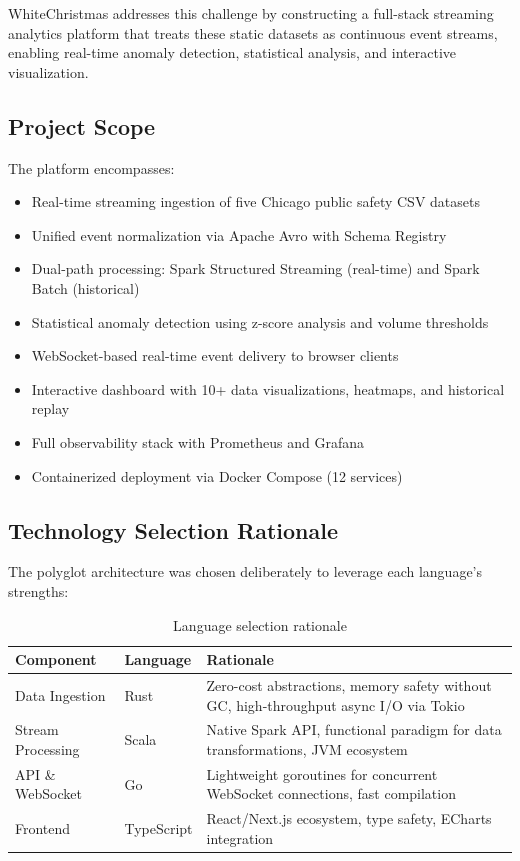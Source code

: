 \documentclass[12pt,a4paper]{article}
\begin{document}
WhiteChristmas addresses this challenge by constructing a full-stack streaming analytics platform that treats these static datasets as continuous event streams, enabling real-time anomaly detection, statistical analysis, and interactive visualization.

\subsection{Project Scope}

The platform encompasses:
\begin{itemize}
  \item Real-time streaming ingestion of five Chicago public safety CSV datasets
  \item Unified event normalization via Apache Avro with Schema Registry
  \item Dual-path processing: Spark Structured Streaming (real-time) and Spark Batch (historical)
  \item Statistical anomaly detection using z-score analysis and volume thresholds
  \item WebSocket-based real-time event delivery to browser clients
  \item Interactive dashboard with 10+ data visualizations, heatmaps, and historical replay
  \item Full observability stack with Prometheus and Grafana
  \item Containerized deployment via Docker Compose (12 services)
\end{itemize}

\subsection{Technology Selection Rationale}

The polyglot architecture was chosen deliberately to leverage each language's strengths:

\begin{table}[H]
\centering
\caption{Language selection rationale}
\begin{tabularx}{\textwidth}{l l X}
\toprule
\textbf{Component} & \textbf{Language} & \textbf{Rationale} \\
\midrule
Data Ingestion & Rust & Zero-cost abstractions, memory safety without GC, high-throughput async I/O via Tokio \\
Stream Processing & Scala & Native Spark API, functional paradigm for data transformations, JVM ecosystem \\
API \& WebSocket & Go & Lightweight goroutines for concurrent WebSocket connections, fast compilation \\
Frontend & TypeScript & React/Next.js ecosystem, type safety, ECharts integration \\
\bottomrule
\end{tabularx}
\end{table}
\end{document}
